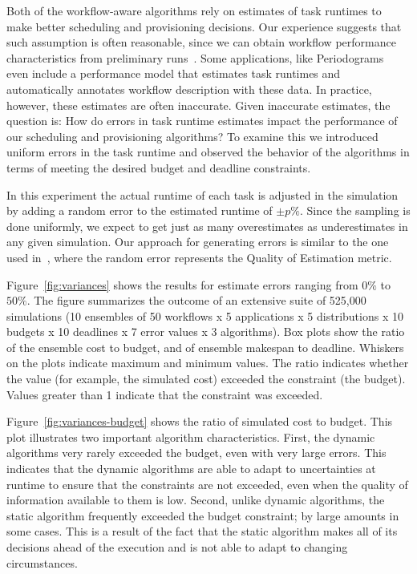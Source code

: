 \documentclass[preprint,5p]{elsarticle}
\begin{document}
Both of the workflow-aware algorithms rely on estimates of task runtimes to make
better scheduling and provisioning decisions. Our experience suggests that such
assumption is often reasonable, since we can obtain workflow performance
characteristics from preliminary runs~\cite{Bharathi2008,Deelman2005,Juve2010}.
Some applications, like Periodograms~\cite{Vockler2011} even include a
performance model that estimates task runtimes and automatically annotates
workflow description with these data. In practice, however, these
estimates are often inaccurate. Given inaccurate estimates, the question is: How
do errors in task runtime estimates impact the performance of our scheduling and
provisioning algorithms?  To examine this we introduced uniform errors in the
task runtime and observed the behavior of the algorithms in terms of meeting the
desired budget and deadline constraints.


In this experiment the actual runtime of each task is adjusted in the
simulation by adding a random error to the estimated runtime of $\pm p\%$.
Since the sampling is done uniformly, we expect to get just as many
overestimates as underestimates in any given simulation. 
Our approach for generating errors is similar to the one used in~\cite{Zheng2013b},
where the random error represents the Quality of Estimation metric.

Figure~\ref{fig:variances} shows the results for estimate errors
ranging from $0\%$ to $50\%$. The figure summarizes the outcome of an
extensive suite of 525,000 simulations (10 ensembles of 50 workflows x 5
applications x 5 distributions x 10 budgets x 10 deadlines x 7 error values x
3 algorithms). Box plots show the ratio of the ensemble cost to
budget, and of ensemble makespan to deadline. Whiskers on the plots
indicate maximum and minimum values. The ratio indicates whether the value 
(for example, the simulated cost) exceeded the constraint (the budget). Values
greater than 1 indicate that the constraint was exceeded. 

Figure~\ref{fig:variances-budget} shows the ratio of simulated cost to budget. This
plot illustrates two important algorithm characteristics. First, the dynamic
algorithms very rarely exceeded the budget, even with very large errors. This
indicates that the dynamic algorithms are able to adapt to uncertainties at
runtime to ensure that the constraints are not exceeded, even when the quality
of information available to them is low. Second, unlike dynamic
algorithms, the static algorithm frequently exceeded the budget constraint; by
large amounts in some cases. This is a result of the fact that the static
algorithm makes all of its decisions ahead of the execution and is not able to adapt
to changing circumstances.
\end{document}
